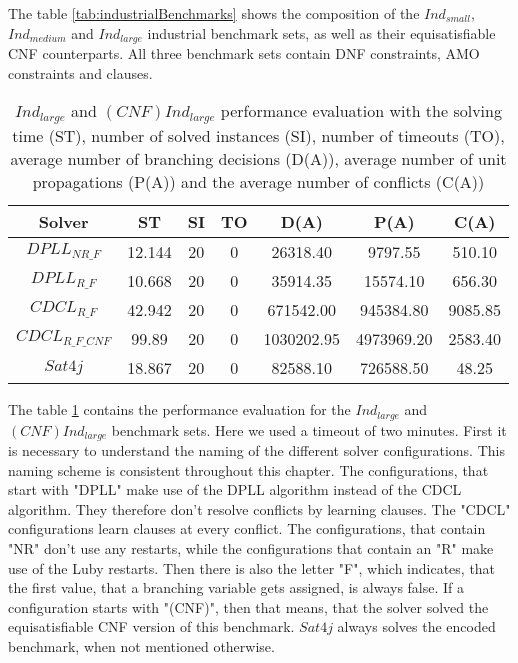 The table \ref{tab:industrialBenchmarks} shows the composition of the $Ind_{small}$, $Ind_{medium}$ and $Ind_{large}$ industrial benchmark sets, as well as their equisatisfiable CNF counterparts. All three benchmark sets contain DNF constraints, AMO constraints and clauses.


\begin{table}[!htb]
\centering
\caption[$Ind_{large}$ and $(CNF)Ind_{large}$ performance evaluation]{$Ind_{large}$ and $(CNF)Ind_{large}$ performance evaluation with the solving time (ST), number of solved instances (SI), number of timeouts (TO), average number of branching decisions (D(A)), average number of unit propagations (P(A)) and the average number of conflicts (C(A))}
\label{tab:mBenchmarks}
\begin{tabular}{|c|c|c|c|c|c|c|}
\hline
Solver & ST & SI & TO & D(A) & P(A) & C(A)\\ 
\hline
$DPLL_{NR\_F}$ & 12.144 & 20 & 0 & 26318.40 & 9797.55 & 510.10 \\ 
\hline
$DPLL_{R\_F}$ & 10.668 & 20 & 0 & 35914.35 & 15574.10 & 656.30 \\ 
\hline
$CDCL_{R\_F}$ & 42.942 & 20 & 0 & 671542.00 & 945384.80 & 9085.85 \\ 
\hline
$CDCL_{R\_F\_CNF}$ & 99.89 & 20 & 0 & 1030202.95 & 4973969.20 & 2583.40 \\ 
\hline
$Sat4j$ & 18.867 & 20 & 0 & 82588.10 & 726588.50 & 48.25 \\ 
\hline
\end{tabular}
\end{table}

The table \ref{tab:mBenchmarks} contains the performance evaluation for the $Ind_{large}$ and $(CNF)Ind_{large}$ benchmark sets. Here we used a timeout of two minutes. First it is necessary to understand the naming of the different solver configurations. This naming scheme is consistent throughout this chapter. The configurations, that start with "DPLL" make use of the DPLL algorithm instead of the CDCL algorithm. They therefore don't resolve conflicts by learning clauses. The "CDCL" configurations learn clauses at every conflict. The configurations, that contain "NR" don't use any restarts, while the configurations that contain an "R" make use of the Luby restarts. Then there is also the letter "F", which indicates, that the first value, that a branching variable gets assigned, is always false. If a configuration starts with "(CNF)", then that means, that the solver solved the equisatisfiable CNF version of this benchmark. $Sat4j$ always solves the encoded benchmark, when not mentioned otherwise.

